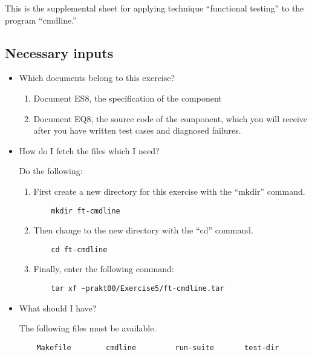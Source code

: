 
This is the supplemental sheet 
for applying technique ``functional testing''
to the program ``cmdline.'' 

\subsection*{Necessary inputs}

\begin{itemize}

\item Which documents belong to this exercise?

\begin{enumerate}
\item Document ES8, the specification of the component
\item Document EQ8, the source code of the component, which you will
receive after you have written test cases and diagnosed failures.
\end{enumerate}

\item How do I fetch the files which I need?

Do the following:

\begin{enumerate}

\item First create a new directory for this exercise with the
``mkdir'' command.
\begin{verbatim}
    mkdir ft-cmdline
\end{verbatim}

\item Then change to the new directory with the ``cd'' command.
\begin{verbatim}
    cd ft-cmdline
\end{verbatim}

\item Finally, enter the following command:
\begin{path}
\begin{verbatim}
    tar xf ~prakt00/Exercise5/ft-cmdline.tar
\end{verbatim}
\end{path}

\end{enumerate}


\item What should I have?

The following files must be available.
\begin{verbatim}
    Makefile        cmdline         run-suite       test-dir
\end{verbatim}

\end{itemize}

